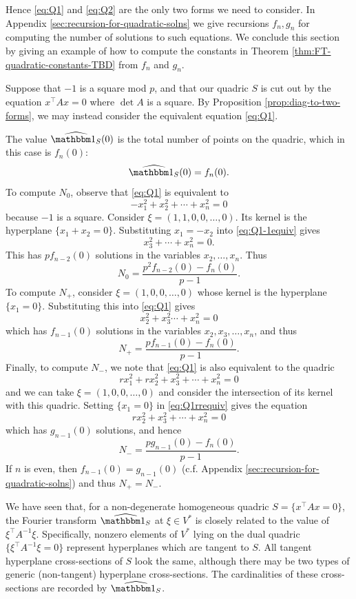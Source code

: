 Hence \eqref{eq:Q1} and \eqref{eq:Q2} are the only two forms we need to consider. In Appendix \ref{sec:recursion-for-quadratic-solns} we give recursions $f_n, g_n$ for computing the number of solutions to such equations. We conclude this section by giving an example of how to compute the constants in Theorem \ref{thm:FT-quadratic-constants-TBD} from $f_n$ and $g_n$.

\begin{example}
	Suppose that $-1$ is a square mod $p$, and that our quadric $S$ is cut out by the equation $x^\top A x = 0$ where $\det A$ is a square. By Proposition \ref{prop:diag-to-two-forms}, we may instead consider the equivalent equation \eqref{eq:Q1}.
	
	The value $\widehat{\IND_S}(0)$ is the total number of points on the quadric, which in this case is $f_n (0)$:
	\[
		\widehat{\IND_S}(0) = f_n(0).
	\]
	To compute $N_0$, observe that \eqref{eq:Q1} is equivalent to
	\begin{equation}\label{eq:Q1-1equiv}
		-x_1^2 + x_2^2 + \cdots + x_n^2 = 0
	\end{equation}
	because $-1$ is a square. Consider $\xi = (1,1,0,0,\ldots,0)$. Its kernel is the hyperplane $\{x_1 + x_2 = 0\}$. Substituting $x_1 = -x_2$ into \eqref{eq:Q1-1equiv} gives
	\[
	x_3^2 + \cdots + x_n^2 = 0.
	\]
	This has $p f_{n-2}(0)$ solutions in the variables $x_2,\ldots,x_n$. Thus
	\[
	N_0 = \frac{p^2 f_{n-2}(0) - f_n(0)}{p-1}.
	\]
	To compute $N_+$, consider $\xi = (1,0,0,\ldots,0)$ whose kernel is the hyperplane $\{x_1 = 0\}$. Substituting this into \eqref{eq:Q1} gives
	\[
	x_2^2 + x_3^2 \cdots + x_n^2 = 0
	\]
	which has $f_{n-1}(0)$ solutions in the variables $x_2,x_3,\ldots,x_n$, and thus
	\[
	N_+ = \frac{p f_{n-1}(0) - f_n(0)}{p-1}.
	\]
	Finally, to compute $N_-$, we note that \eqref{eq:Q1} is also equivalent to the quadric
	\begin{equation}\label{eq:Q1rrequiv}
		rx_1^2 + rx_2^2 + x_3^2 + \cdots + x_n^2 = 0
	\end{equation}
	and we can take $\xi = (1,0,0,\ldots,0)$ and consider the intersection of its kernel with this quadric. Setting $\{x_1 = 0\}$ in \eqref{eq:Q1rrequiv} gives the equation
	\[
		rx_2^2 + x_3^2 + \cdots + x_n^2 = 0
	\]
	which has $g_{n-1}(0)$ solutions, and hence
	\[
		N_- = \frac{pg_{n-1}(0) - f_n(0)}{p-1}.
	\]
	If $n$ is even, then $f_{n-1}(0) = g_{n-1}(0)$ (c.f. Appendix \ref{sec:recursion-for-quadratic-solns}) and thus $N_+ = N_-$.
\end{example}

We have seen that, for a non-degenerate homogeneous quadric $S = \{x^\top A x = 0\}$, the Fourier transform $\widehat{\IND_S}$ at $\xi\in V^*$ is closely related to the value of $\xi^\top A^{-1} \xi$. Specifically, nonzero elements of $V^*$ lying on the dual quadric $\{\xi^\top A^{-1} \xi = 0\}$ represent hyperplanes which are tangent to $S$. All tangent hyperplane cross-sections of $S$ look the same, although there may be two types of generic (non-tangent) hyperplane cross-sections. The cardinalities of these cross-sections are recorded by $\widehat{\IND_S}$.
